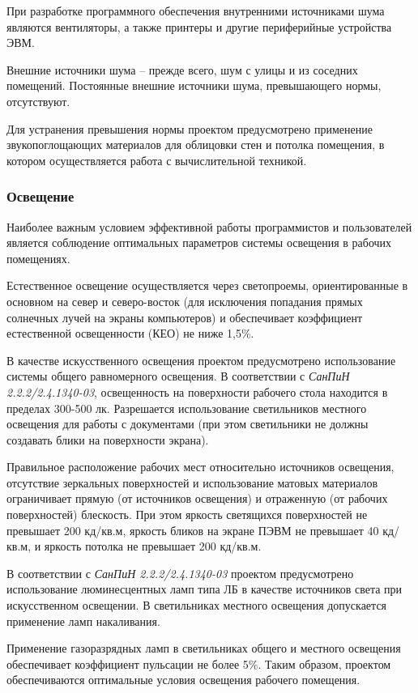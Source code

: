 При разработке программного обеспечения внутренними источниками шума являются вентиляторы, а также принтеры и другие периферийные
устройства ЭВМ. 

Внешние источники шума -- прежде всего, шум с улицы и из соседних помещений. Постоянные внешние источники шума, превышающего нормы,
отсутствуют.

Для устранения превышения нормы проектом предусмотрено применение звукопоглощающих материалов для облицовки стен и потолка
помещения, в котором осуществляется работа с вычислительной техникой.

\subsubsection{Освещение}
Наиболее важным условием эффективной работы программистов и пользователей является соблюдение оптимальных параметров системы
освещения в рабочих помещениях.

Естественное освещение осуществляется через светопроемы, ориентированные в основном на север и северо-восток (для исключения
        попадания прямых солнечных лучей на экраны компьютеров) и обеспечивает коэффициент естественной освещенности (КЕО) не ниже
1,5\%.

В качестве искусственного освещения проектом предусмотрено использование системы общего равномерного освещения. В соответствии с
\textit{СанПиН 2.2.2/2.4.1340-03},  освещенность на поверхности рабочего стола находится в пределах 300-500 лк. Разрешается использование
светильников местного освещения для работы с документами (при этом светильники не должны создавать блики на поверхности экрана).

Правильное расположение рабочих мест относительно источников освещения, отсутствие зеркальных поверхностей и использование матовых
материалов ограничивает прямую (от источников освещения) и отраженную (от рабочих поверхностей) блескость. При этом яркость
светящихся поверхностей не превышает 200 кд/кв.м, яркость бликов на экране ПЭВМ не превышает 40 кд/кв.м, и яркость потолка не
превышает 200 кд/кв.м.

В соответствии с \textit{СанПиН 2.2.2/2.4.1340-03}  проектом предусмотрено использование люминесцентных ламп типа ЛБ в качестве источников
света при искусственном освещении. В светильниках местного освещения допускается применение ламп накаливания.

Применение газоразрядных ламп в светильниках общего и местного освещения обеспечивает коэффициент пульсации не более 5\%.
Таким образом, проектом обеспечиваются оптимальные условия освещения рабочего помещения.

